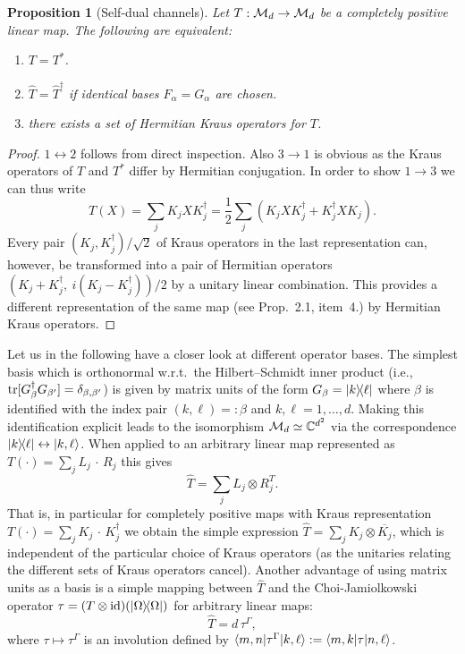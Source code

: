 \documentclass[11pt,a4paper]{article}
\numberwithin{equation}{section}
\theoremstyle{plain}
\newtheorem{proposition}{Proposition}[section]
\theoremstyle{definition}
\begin{document}
\begin{proposition}[Self-dual channels]
    Let $T:\mathcal{M}_d \to \mathcal{M}_d$ be a completely positive linear map. The following are
    equivalent:
    \begin{enumerate}
        \item $T = T^*$.
        \item $\widehat{T}=\widehat{T}^\dagger$ if identical bases $F_\alpha=G_\alpha$ are chosen.
        \item there exists a set of Hermitian Kraus operators for $T$.
    \end{enumerate}
\end{proposition}

\begin{proof}
    $1\leftrightarrow 2$ follows from direct inspection. Also $3\to 1$ is obvious as the
    Kraus operators of $T$ and $T^*$ differ by Hermitian conjugation. In order to show
    $1\to 3$ we can thus write
    \[
        T(X) = \sum_j K_j X K_j^\dagger
        = \frac{1}{2}\sum_j(K_j X K_j^\dagger + K_j^\dagger X K_j).
    \]
    Every pair $(K_j,K_j^\dagger)/\sqrt{2}$ of Kraus operators in the last representation
    can, however, be transformed into a pair of Hermitian operators
    $(K_j+K_j^\dagger,\ i(K_j-K_j^\dagger))/2$ by a unitary linear combination.
    This provides a different representation of the same map (see Prop.~2.1, item~4.)
    by Hermitian Kraus operators.
\end{proof}

Let us in the following have a closer look at different operator bases. The simplest
basis which is orthonormal w.r.t.\ the Hilbert--Schmidt inner product (i.e.,
$\operatorname{tr}[G_\beta^\dagger G_{\beta'}]=\delta_{\beta,\beta'}$) is given by matrix units of
the form $G_\beta=|k\rangle\!\langle\ell|$ where $\beta$ is identified with the index pair
$(k,\ell)=:\beta$ and $k,\ell=1,\dots,d$. Making this identification explicit leads
to the isomorphism $\mathcal{M}_d \simeq \mathbb{C}^{d^2}$ via the correspondence
$|k\rangle\!\langle\ell| \leftrightarrow |k,\ell\rangle$. When applied to an arbitrary linear
map represented as $T(\cdot)=\sum_j L_j\,\cdot\,R_j$ this gives
\begin{equation}\label{eq:2.21}
    \widehat{T} = \sum_j L_j \otimes R_j^{T}.
\end{equation}
That is, in particular for completely positive maps with Kraus representation
$T(\cdot)=\sum_j K_j\,\cdot\,K_j^\dagger$ we obtain the simple expression
$\widehat{T}=\sum_j K_j \otimes \overline{K_j}$, which is independent of the
particular choice of Kraus operators (as the unitaries relating the different sets
of Kraus operators cancel). Another advantage of using matrix units as a basis is a
simple mapping between $\widehat{T}$ and the Choi-Jamiolkowski operator
$\tau=(T\otimes \mathrm{id})(|\Omega\rangle\!\langle\Omega|)$ for arbitrary linear maps:
\begin{equation}\label{eq:2.22}
    \widehat{T} = d\,\tau^\Gamma,
\end{equation}
where $\tau\mapsto \tau^\Gamma$ is an involution defined by
$\langle m,n|\tau^\Gamma|k,\ell\rangle := \langle m,k|\tau|n,\ell\rangle$.
\end{document}
